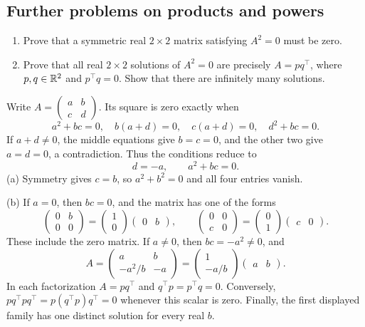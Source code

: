 \subsection*{Further problems on products and powers}
\begin{problem}\label{ex:02:square-zero}
\begin{enumerate}
\item Prove that a symmetric real $2\times2$ matrix satisfying $A^2=0$ must be zero.
\item Prove that all real $2\times2$ solutions of $A^2=0$ are precisely
$A=pq^\top$, where $p,q\in\mathbb R^2$ and $p^\top q=0$. Show that there are infinitely many solutions.
\end{enumerate}
\end{problem}
\begin{solution}
Write $A=\begin{pmatrix}a&b\\c&d\end{pmatrix}$. Its square is zero exactly when
\[
a^2+bc=0,\quad b(a+d)=0,\quad c(a+d)=0,\quad d^2+bc=0.
\]
If $a+d\ne0$, the middle equations give $b=c=0$, and the other two give
$a=d=0$, a contradiction. Thus the conditions reduce to
\[
d=-a,\qquad a^2+bc=0.
\]
(a) Symmetry gives $c=b$, so $a^2+b^2=0$ and all four entries vanish.

(b) If $a=0$, then $bc=0$, and the matrix has one of the forms
\[
\begin{pmatrix}0&b\\0&0\end{pmatrix}
=\begin{pmatrix}1\\0\end{pmatrix}\begin{pmatrix}0&b\end{pmatrix},
\qquad
\begin{pmatrix}0&0\\c&0\end{pmatrix}
=\begin{pmatrix}0\\1\end{pmatrix}\begin{pmatrix}c&0\end{pmatrix}.
\]
These include the zero matrix. If $a\ne0$, then $bc=-a^2\ne0$, and
\[
A=\begin{pmatrix}a&b\\-a^2/b&-a\end{pmatrix}
 =\begin{pmatrix}1\\-a/b\end{pmatrix}\begin{pmatrix}a&b\end{pmatrix}.
\]
In each factorization $A=pq^\top$ and $q^\top p=p^\top q=0$.
Conversely, $pq^\top pq^\top=p(q^\top p)q^\top=0$ whenever this scalar is zero.
Finally, the first displayed family has one distinct solution for every real $b$.
\end{solution}

